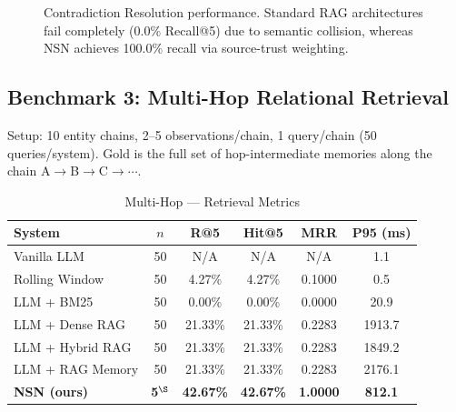 \documentclass[conference]{IEEEtran}
\begin{document}
\begin{figure}[htbp]
\centering
{}
\caption{Contradiction Resolution performance. Standard RAG architectures fail completely (0.0\% Recall@5) due to semantic collision, whereas NSN achieves 100.0\% recall via source-trust weighting.}
\label{fig:contradiction_resolution}
\end{figure}

\subsection{Benchmark 3: Multi-Hop Relational Retrieval}
Setup: 10 entity chains, 2--5 observations/chain, 1 query/chain (50 queries/system). Gold is the full set of hop-intermediate memories along the chain A$\rightarrow$B$\rightarrow$C$\rightarrow\cdots$.

\begin{table}[t]
\caption{Multi-Hop --- Retrieval Metrics}
\label{tab:multihop}
\centering
\scriptsize
\begin{tabular}{@{}lccccc@{}}
\toprule
\textbf{System} & $n$ & \textbf{R@5} & \textbf{Hit@5} & \textbf{MRR} & \textbf{P95 (ms)} \\
\midrule
Vanilla LLM & 50 & N/A & N/A & N/A & 1.1 \\
Rolling Window & 50 & 4.27\% & 4.27\% & 0.1000 & 0.5 \\
LLM + BM25 & 50 & 0.00\% & 0.00\% & 0.0000 & 20.9 \\
LLM + Dense RAG & 50 & 21.33\% & 21.33\% & 0.2283 & 1913.7 \\
LLM + Hybrid RAG & 50 & 21.33\% & 21.33\% & 0.2283 & 1849.2 \\
LLM + RAG Memory & 50 & 21.33\% & 21.33\% & 0.2283 & 2176.1 \\
\textbf{NSN (ours)} & \textbf{5}$^{\S}$ & \textbf{42.67\%} & \textbf{42.67\%} & \textbf{1.0000} & \textbf{812.1} \\
\bottomrule
\end{tabular}
\end{table}
\end{document}
